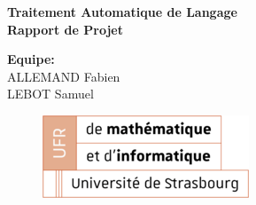 \documentclass{article}
\begin{document}
\thispagestyle{empty}
\addtocounter{page}{-1}
\begin{center}
	\baselineskip=50pt
	\vspace*{1cm}
	\textbf{{\Huge Traitement Automatique de Langage}}\\
	\vspace*{0.25cm}
	\textbf{{\Huge Rapport de Projet}}\\
	\vspace*{0.25cm}
	\begin{minipage}[c]{.46\linewidth}
        \centering
        \textbf{Equipe:}\\
		ALLEMAND Fabien\\
        LEBOT Samuel
    \end{minipage}
\end{center}
\vspace*{0.1cm}

\begin{figure}[H]
\centering
\centerline{\includegraphics[scale=1.]{img/logo_UFR_2.png}}
\end{figure}


\newpage
\renewcommand{\contentsname}{Table des matières}
\tableofcontents

\newpage
{}
\renewcommand{\listfigurename}{Liste des figures}
\listoffigures

\newpage
{}
\vspace*{0.01cm}






% 



\newpage
{}
\renewcommand{\refname}{Bibliographie}


\end{document}
